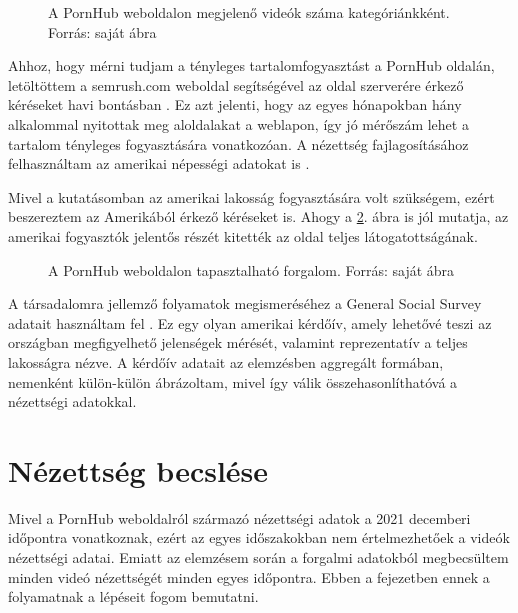 \documentclass[12pt,a4paper]{article}
\begin{document}
\begin{figure}[h]
    \caption[A pornográf videók száma kategóriánkként]{\footnotesize{A PornHub weboldalon megjelenő videók száma kategóriánkként. Forrás: saját ábra}}
    \label{video.cat.series}
    \begin{center}
        
    \end{center}
\end{figure}

Ahhoz, hogy mérni tudjam a tényleges tartalomfogyasztást a PornHub oldalán, letöltöttem a semrush.com weboldal segítségével az oldal szerverére érkező kéréseket havi bontásban \citep{semrush_2021}. Ez azt jelenti, hogy az egyes hónapokban hány alkalommal nyitottak meg aloldalakat a weblapon, így jó mérőszám lehet a tartalom tényleges fogyasztására vonatkozóan. 
A nézettség fajlagosításához felhasználtam az amerikai népességi adatokat is \citep{fred_2021}.

\pagebreak
Mivel a kutatásomban az amerikai lakosság fogyasztására volt szükségem, ezért beszereztem az Amerikából érkező kéréseket is. Ahogy a \ref{traffic.series}. ábra is jól mutatja, az amerikai fogyasztók jelentős részét kitették az oldal teljes látogatottságának.

\begin{figure}[h]
    \caption[A PornHub forgalma]{\footnotesize{A PornHub weboldalon tapasztalható forgalom. Forrás: saját ábra}}
    \label{traffic.series}
    \begin{center}
        
    \end{center}
\end{figure}

A társadalomra jellemző folyamatok megismeréséhez a General Social Survey adatait használtam fel \citep{gss_2021}. Ez egy olyan amerikai kérdőív, amely lehetővé teszi az országban megfigyelhető jelenségek mérését, valamint reprezentatív a teljes lakosságra nézve. A kérdőív adatait az elemzésben aggregált formában, nemenként külön-külön ábrázoltam, mivel így válik összehasonlíthatóvá a nézettségi adatokkal.

\section{Nézettség becslése}

Mivel a PornHub weboldalról származó nézettségi adatok a 2021 decemberi időpontra vonatkoznak, ezért az egyes időszakokban nem értelmezhetőek a videók nézettségi adatai. Emiatt az elemzésem során a forgalmi adatokból megbecsültem minden videó nézettségét minden egyes időpontra. Ebben a fejezetben ennek a folyamatnak a lépéseit fogom bemutatni.
\end{document}
